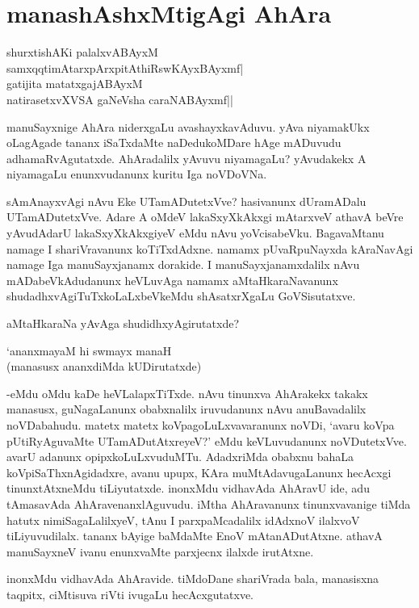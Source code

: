 \chapter{manashAshxMtigAgi AhAra}

\begin{shloka}
shurxtishAKi palalxvABAyxM\\
samxqqtimAtarxpArxpitAthiRswKAyxBAyxmf|\\
gatijita matatxgajABAyxM\\
natirasetxvXVSA gaNeVsha caraNABAyxmf||
\end{shloka}

manuSayxnige AhAra niderxgaLu avashayxkavAduvu. yAva niyamakUkx oLagAgade tananx iSaTxdaMte naDedukoMDare hAge mADuvudu adhamaRvAgutatxde. AhAradalilx yAvuvu niyamagaLu? yAvudakekx A niyamagaLu enunxvudanunx kuritu Iga noVDoVNa.

sAmAnayxvAgi nAvu Eke UTamADutetxVve? hasivanunx dUramADalu UTamADutetxVve. Adare A oMdeV lakaSxyXkAkxgi mAtarxveV athavA beVre yAvudAdarU lakaSxyXkAkxgiyeV eMdu nAvu yoVcisabeVku. BagavaMtanu namage I shariVravanunx koTiTxdAdxne. namamx pUvaRpuNayxda kAraNavAgi namage Iga manuSayxjanamx dorakide. I manuSayxjanamxdalilx nAvu mADabeVkAdudanunx heVLuvAga namamx aMtaHkaraNavanunx shudadhxvAgiTuTxkoLaLxbeVkeMdu shAsatxrXgaLu GoVSisutatxve.

aMtaHkaraNa yAvAga shudidhxyAgirutatxde?

\begin{shloka}
`ananxmayaM hi swmayx manaH\\
(manasusx ananxdiMda kUDirutatxde)
\end{shloka}

-eMdu oMdu kaDe heVLalapxTiTxde. nAvu tinunxva AhArakekx takakx manasusx, guNagaLanunx obabxnalilx iruvudanunx nAvu anuBavadalilx noVDabahudu. matetx matetx koVpagoLuLxvavaranunx noVDi, `avaru koVpa pUtiRyAguvaMte UTamADutAtxreyeV?' eMdu keVLuvudanunx noVDutetxVve. avarU adanunx opipxkoLuLxvuduMTu. AdadxriMda obabxnu bahaLa koVpiSaThxnAgidadxre, avanu upupx, KAra muMtAdavugaLanunx hecAcxgi tinunxtAtxneMdu tiLiyutatxde. inonxMdu vidhavAda AhAravU ide, adu tAmasavAda AhAravenanxlAguvudu. iMtha AhAravanunx tinunxvavanige tiMda hatutx nimiSagaLalilxyeV, tAnu I parxpaMcadalilx idAdxnoV ilalxvoV tiLiyuvudilalx. tananx bAyige baMdaMte EnoV mAtanADutAtxne. athavA manuSayxneV ivanu enunxvaMte parxjecnx ilalxde irutAtxne.

inonxMdu vidhavAda AhAravide. tiMdoDane shariVrada bala, manasisxna taqpitx, ciMtisuva riVti ivugaLu hecAcxgutatxve.

